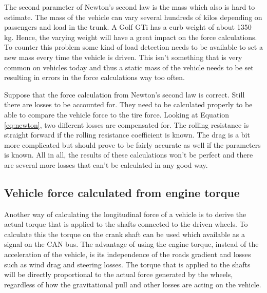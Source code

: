 The second parameter of Newton's second law is the mass which also is hard to estimate. The mass of the vehicle can vary several hundreds of kilos depending on passengers and load in the trunk. A Golf GTi has a curb weight of about 1350 kg. Hence, the varying weight will have a great impact on the force calculations. To counter this problem some kind of load detection needs to be available to set a new mass every time the vehicle is driven. This isn't something that is very common on vehicles today and thus a static mass of the vehicle needs to be set resulting in errors in the force calculations way too often.

Suppose that the force calculation from Newton's second law is correct. Still there are losses to be accounted for. They need to be calculated properly to be able to compare the vehicle force to the tire force. Looking at Equation \ref{eq:newton}, two different losses are compensated for. The rolling resistance is straight forward if the rolling resistance coefficient is known. The drag is a bit more complicated but should prove to be fairly accurate as well if the parameters is known. All in all, the results of these calculations won't be perfect and there are several more losses that can't be calculated in any good way.


\subsection{Vehicle force calculated from engine torque}
Another way of calculating the longitudinal force of a vehicle is to derive the actual torque that is applied to the shafts connected to the driven wheels. To calculate this the torque on the crank shaft can be used which available as a signal on the CAN bus. The advantage of using the engine torque, instead of the acceleration of the vehicle, is its independence of the roads gradient and losses such as wind drag and steering losses. The torque that is applied to the shafts will be directly proportional to the actual force generated by the wheels, regardless of how the gravitational pull and other losses are acting on the vehicle. 

